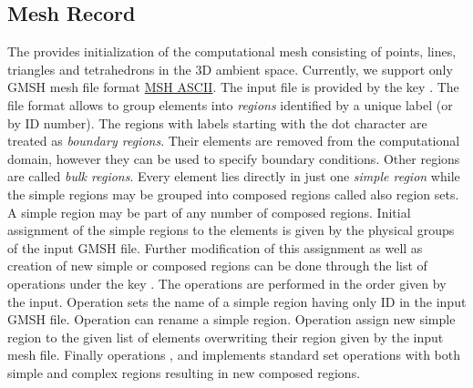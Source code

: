\subsection{Mesh Record}
\label{sec:Mesh}
The  provides initialization of the computational mesh consisting of points, lines, triangles and tetrahedrons in the 3D ambient space.
Currently, we support only GMSH mesh file format \href{http://geuz.org/gmsh/doc/texinfo/gmsh.html#MSH-ASCII-file-format}{MSH ASCII}. 
The input file is provided by the key . The file format allows to group elements into {\it regions} 
identified by a unique label (or by ID number). The regions with labels starting with the dot character are treated as {\it boundary regions}. 
Their elements are removed from the computational domain, however they can be used to specify boundary
conditions. Other regions are called {\it bulk regions}. Every element lies directly in just one {\it simple region} while the simple regions may be 
grouped into composed regions called also region sets. A simple region may be part of any number of composed regions.
Initial assignment of the simple regions to the elements is given by the physical groups of the input GMSH file. Further
modification of this assignment as well as creation of new simple or composed regions can be done 
through the list of operations under the key . The operations are performed in the order given by the input.
Operation  sets the name of a simple region having only ID in the input GMSH file. Operation 
 can rename a simple region. Operation 
assign new simple region to the given list of elements overwriting their region given by the input mesh file. Finally operations 
,  and 
implements standard set operations with both simple and complex regions resulting in new composed regions.




